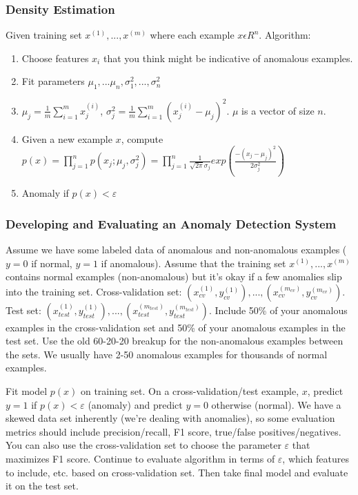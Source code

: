 \documentclass[11pt,letterpaper]{article}
\begin{document}
\subsubsection{Density Estimation}
Given training set $x^{(1)},...,x^{(m)}$ where each example $x \epsilon R^n$. Algorithm:
\begin{enumerate}
	\item Choose features $x_i$ that you think might be indicative of anomalous examples.
	\item Fit parameters $\mu_1,...\mu_n, \sigma^2_1,...,\sigma^2_n$
	\item $\mu_j = \frac{1}{m}\sum_{i=1}^{m}x_j^{(i)}$, $\sigma^2_j = \frac{1}{m}\sum_{i=1}^{m}(x_j^{(i)} - \mu_j)^2$. $\mu$ is a vector of size $n$.
	\item Given a new example $x$, compute $p(x) = \prod_{j=1}^np(x_j;\mu_j,\sigma^2_j) = \prod_{j=1}^n \frac{1}{\sqrt{2\pi}\sigma_j}exp(\frac{-(x_j-\mu_j)^2 } {2 \sigma_j^2 })$
	\item Anomaly if $p(x) < \varepsilon$
\end{enumerate}

\subsubsection{Developing and Evaluating an Anomaly Detection System}
Assume we have some labeled data of anomalous and non-anomalous examples ($y = 0$ if normal, $y=1$ if anomalous). Assume that the training set $x^{(1)},...,x^{(m)}$ contains normal examples (non-anomalous) but it's okay if a few anomalies slip into the training set. Cross-validation set: $(x_{cv}^{(1)},y_{cv}^{(1)}),...,(x_{cv}^{(m_{cv})},y_{cv}^{(m_{cv})})$. Test set: $(x_{test}^{(1)},y_{test}^{(1)}),...,(x_{test}^{(m_{test})},y_{test}^{(m_{test})})$. Include 50\% of your anomalous examples in the cross-validation set and 50\% of your anomalous examples in the test set. Use the old 60-20-20 breakup for the non-anomalous examples between the sets. We usually have 2-50 anomalous examples for thousands of normal examples.

Fit model $p(x)$ on training set. On a cross-validation/test example, $x$, predict $y = 1$ if $p(x) < \varepsilon $ (anomaly) and predict $y = 0$ otherwise (normal). We have a skewed data set inherently (we're dealing with anomalies), so some evaluation metrics should include precision/recall, F1 score, true/false positives/negatives. You can also use the cross-validation set to choose the parameter $\varepsilon$ that maximizes F1 score. Continue to evaluate algorithm in terms of $\varepsilon$, which features to include, etc. based on cross-validation set. Then take final model and evaluate it on the test set.
\end{document}
